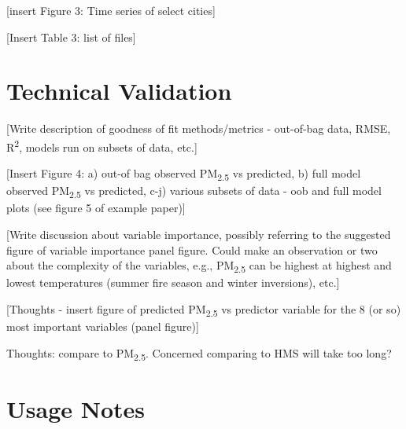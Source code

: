 \documentclass[english]{article}
\begin{document}
[insert Figure 3: Time series of select cities] %

[Insert Table 3: list of files]

\section*{Technical Validation}


[Write description of goodness of fit methods/metrics - out-of-bag data, RMSE, R\textsuperscript{2}, models run on subsets of data, etc.]

[Insert Figure 4: a) out-of bag observed PM\textsubscript{2.5} vs predicted, b) full model observed PM\textsubscript{2.5} vs predicted, c-j) various subsets of data - oob and full model plots (see figure 5 of example paper)]

[Write discussion about variable importance, possibly referring to the suggested figure of variable importance panel figure. Could make an observation or two about the complexity of the variables, e.g., PM\textsubscript{2.5} can be highest at highest and lowest temperatures (summer fire season and winter inversions), etc.]

[Thoughts - insert figure of predicted PM\textsubscript{2.5} vs predictor variable for the 8 (or so) most important variables (panel figure)]

Thoughts: compare to PM\textsubscript{2.5}. Concerned comparing to HMS will take too long? 


\section*{Usage Notes}

\end{document}
